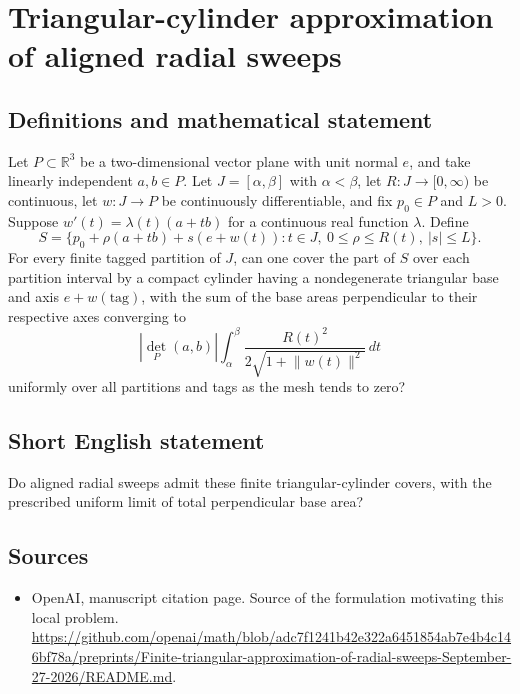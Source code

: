 \documentclass[11pt]{article}
\begin{document}
\section*{Triangular-cylinder approximation of aligned radial sweeps}\label{30007109}
\subsection{Definitions and mathematical statement}
Let $P\subset\mathbb R^3$ be a two-dimensional vector plane with unit normal $e$, and take linearly independent $a,b\in P$. Let $J=[\alpha,\beta]$ with $\alpha<\beta$, let $R:J\to[0,\infty)$ be continuous, let $w:J\to P$ be continuously differentiable, and fix $p_0\in P$ and $L>0$. Suppose $w'(t)=\lambda(t)(a+tb)$ for a continuous real function $\lambda$. Define
\[
 S=\{p_0+\rho(a+tb)+s(e+w(t)):t\in J,\ 0\le\rho\le R(t),\ |s|\le L\}.
\]
For every finite tagged partition of $J$, can one cover the part of $S$ over each partition interval by a compact cylinder having a nondegenerate triangular base and axis $e+w(\text{tag})$, with the sum of the base areas perpendicular to their respective axes converging to
\[
 |\det_P(a,b)|\int_\alpha^\beta
 \frac{R(t)^2}{2\sqrt{1+\lVert w(t)\rVert^2}}\,dt
\]
uniformly over all partitions and tags as the mesh tends to zero?

\subsection{Short English statement}
Do aligned radial sweeps admit these finite triangular-cylinder covers, with the prescribed uniform limit of total perpendicular base area?

\subsection{Sources}
\begin{itemize}
\item[S1] OpenAI, manuscript citation page. Source of the formulation motivating this local problem.
\url{https://github.com/openai/math/blob/adc7f1241b42e322a6451854ab7e4b4c146bf78a/preprints/Finite-triangular-approximation-of-radial-sweeps-September-27-2026/README.md}.
\end{itemize}
\end{document}
